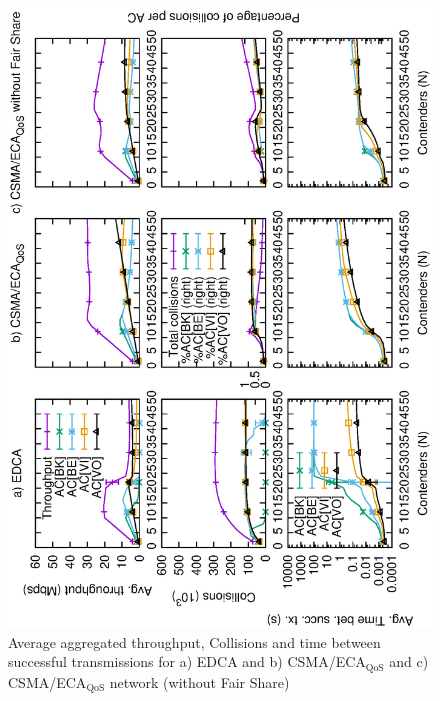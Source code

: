 \begin{itemize}
\begin{figure}[tb]
	\centering
		\includegraphics[width=0.55\linewidth,angle = -90]{figures/multiplot-unsat-error-0-1.eps}
		\caption{Average aggregated throughput, Collisions and time between successful transmissions for a) EDCA and b) CSMA/ECA$_{\text{QoS}}$ and c) CSMA/ECA$_{\text{QoS}}$ network (without Fair Share)}
		\label{fig:multiplotUnsat}
\end{figure}
%
%
%
%	
%
%

\end{itemize}

